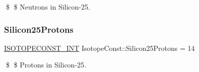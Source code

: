 \$ \$ Neutrons in Silicon-\/25. \mbox{\label{group___isotope_const-_silicon-_si25_gab0978e1f3199464c1131747fdfab4454}} 
\subsubsection{\texorpdfstring{Silicon25\+Protons}{Silicon25Protons}}
{\footnotesize\ttfamily \mbox{\hyperlink{group___isotope_const-_macros_ga5f18360b3e99483a35c32d789e62621c}{I\+S\+O\+T\+O\+P\+E\+C\+O\+N\+S\+T\+\_\+\+I\+NT}} Isotope\+Const\+::\+Silicon25\+Protons = 14}

\$ \$ Protons in Silicon-\/25. 